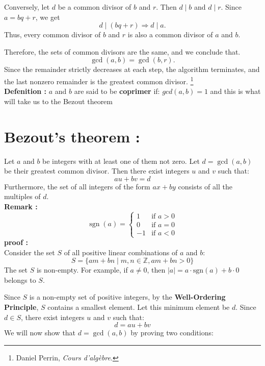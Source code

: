 Conversely, let $d$ be a common divisor of $b$ and $r$. Then $d \mid b$ and $d \mid r$. Since $a = bq + r$, we get
\[
d \mid (bq + r) \Rightarrow d \mid a.
\]
Thus, every common divisor of $b$ and $r$ is also a common divisor of $a$ and $b$.

Therefore, the sets of common divisors are the same, and we conclude that.
\[
\gcd(a,b) = \gcd(b,r).
\]
Since the remainder strictly decreases at each step, the algorithm terminates, and the last nonzero remainder is the greatest common divisor.
\footnote{Daniel Perrin, \textit{Cours d’algèbre}.}\\
\textbf{ Defenition :}
 $a$ and $b$ are said to be \textbf{coprimer} if:
$gcd(a,b)=1$
and this is what will take us to the Bezout theorem
\section{Bezout's theorem :}
Let $a$ and $b$ be integers with at least one of them not zero. Let $d = \gcd(a, b)$ be their greatest common divisor. Then there exist integers $u$ and $v$ such that:
\begin{equation*}
    au + bv = d
\end{equation*}
Furthermore, the set of all integers of the form $ax + by$ consists of all the multiples of $d$.\\
\textbf{Remark :} 
\[
\operatorname{sgn}(a) =
\begin{cases}
1 & \text{if } a > 0 \\
0 & \text{if } a = 0 \\
-1 & \text{if } a < 0
\end{cases}
\]
\textbf{proof :}\\
Consider the set $S$ of all positive linear combinations of $a$ and $b$:
\[ S = \{ am + bn \mid m, n \in \mathbb{Z}, am + bn > 0 \} \]
The set $S$ is non-empty. For example, if $a \neq 0$, then $|a| = a \cdot \text{sgn}(a) + b \cdot 0$ belongs to $S$.

Since $S$ is a non-empty set of positive integers, by the \textbf{Well-Ordering Principle}, $S$ contains a smallest element. Let this minimum element be $d$. Since $d \in S$, there exist integers $u$ and $v$ such that:
\[ d = au + bv \]
We will now show that $d = \gcd(a, b)$ by proving two conditions:

